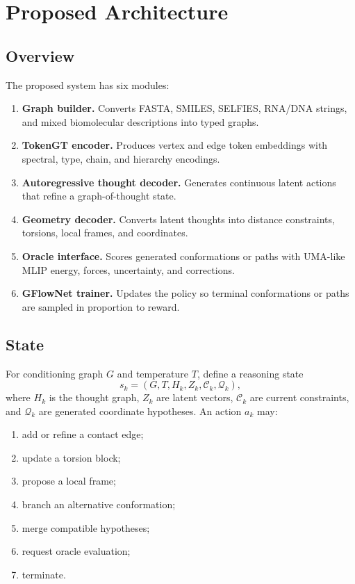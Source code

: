 \documentclass[11pt]{article}
\begin{document}
\section{Proposed Architecture}

\subsection{Overview}

The proposed system has six modules:
\begin{enumerate}[leftmargin=2em]
  \item \textbf{Graph builder.} Converts FASTA, SMILES, SELFIES, RNA/DNA strings, and mixed biomolecular descriptions into typed graphs.
  \item \textbf{TokenGT encoder.} Produces vertex and edge token embeddings with spectral, type, chain, and hierarchy encodings.
  \item \textbf{Autoregressive thought decoder.} Generates continuous latent actions that refine a graph-of-thought state.
  \item \textbf{Geometry decoder.} Converts latent thoughts into distance constraints, torsions, local frames, and coordinates.
  \item \textbf{Oracle interface.} Scores generated conformations or paths with UMA-like MLIP energy, forces, uncertainty, and corrections.
  \item \textbf{GFlowNet trainer.} Updates the policy so terminal conformations or paths are sampled in proportion to reward.
\end{enumerate}

\subsection{State}

For conditioning graph $G$ and temperature $T$, define a reasoning state
\[
s_k=(G,T,H_k,Z_k,\mathcal{C}_k,\mathcal{Q}_k),
\]
where $H_k$ is the thought graph, $Z_k$ are latent vectors, $\mathcal{C}_k$ are current constraints, and $\mathcal{Q}_k$ are generated coordinate hypotheses. An action $a_k$ may:
\begin{enumerate}[leftmargin=2em]
  \item add or refine a contact edge;
  \item update a torsion block;
  \item propose a local frame;
  \item branch an alternative conformation;
  \item merge compatible hypotheses;
  \item request oracle evaluation;
  \item terminate.
\end{enumerate}
\end{document}
